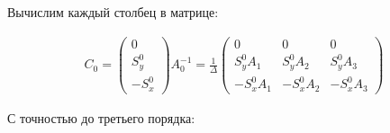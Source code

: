 Вычислим каждый столбец в матрице:

\begin{equation}
\begin{aligned}
	C_0 = \begin{pmatrix}0 \\ S_y^0 \\ -S_x^0\end{pmatrix}A_0^{-1} = \frac{1}{\Delta}\begin{pmatrix}
	0 & 0 & 0 \\ S_y^0A_1 & S_y^0A_2 & S_y^0A_3 \\ -S_x^0A_1 & -S_x^0A_2 & -S_x^0A_3
	\end{pmatrix}
\end{aligned}
\end{equation}

С точностью до третьего порядка:

